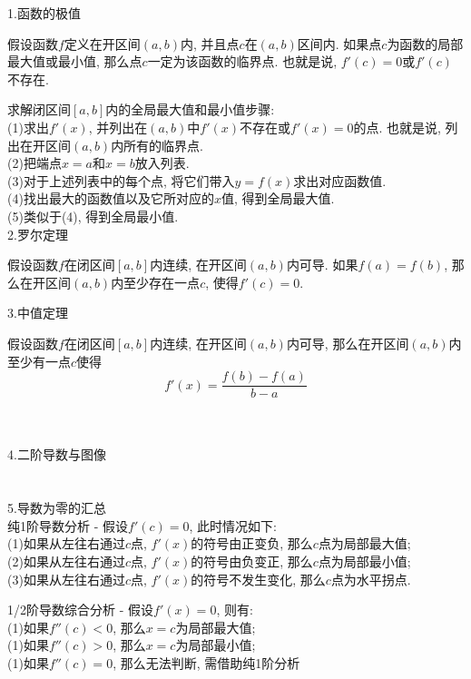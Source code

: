 \documentclass[UTF8, fontset=ubuntu]{ctexart}
\theoremstyle{empty}
\begin{document}
1.函数的极值
\begin{theorem}[极值定理]
假设函数$f$定义在开区间$(a,b)$内, 并且点$c$在$(a,b)$区间内. 如果点$c$为函数的局部最大值或最小值, 那么点$c$一定为该函数的临界点. 也就是说, $f'(c)=0$或$f'(c)$不存在.
\end{theorem}

求解闭区间$[a,b]$内的全局最大值和最小值步骤:\\
(1)求出$f'(x)$, 并列出在$(a,b)$中$f'(x)$不存在或$f'(x)=0$的点. 也就是说, 列出在开区间$(a,b)$内所有的临界点.\\
(2)把端点$x=a$和$x=b$放入列表.\\
(3)对于上述列表中的每个点, 将它们带入$y=f(x)$求出对应函数值.\\
(4)找出最大的函数值以及它所对应的$x$值, 得到全局最大值.\\
(5)类似于(4), 得到全局最小值.\\[2ex]

2.罗尔定理
\begin{theorem}[罗尔定理]
假设函数$f$在闭区间$[a,b]$内连续, 在开区间$(a,b)$内可导. 如果$f(a)=f(b)$, 那么在开区间$(a,b)$内至少存在一点$c$, 使得$f'(c)=0$.
\end{theorem}\vspace{4ex}

3.中值定理
\begin{theorem}[中值定理]
假设函数$f$在闭区间$[a,b]$内连续, 在开区间$(a,b)$内可导, 那么在开区间$(a,b)$内至少有一点$c$使得
\[f'(x)=\frac{f(b)-f(a)}{b-a}\]
\end{theorem}
\\[2ex]
\\[4ex]

4.二阶导数与图像\\[2ex]
\\[2ex]
\\[2ex]

5.导数为零的汇总\\
纯1阶导数分析 - 假设$f'(c)=0$, 此时情况如下:\\
(1)如果从左往右通过$c$点, $f'(x)$的符号由正变负, 那么$c$点为局部最大值;\\
(2)如果从左往右通过$c$点, $f'(x)$的符号由负变正, 那么$c$点为局部最小值;\\
(3)如果从左往右通过$c$点, $f'(x)$的符号不发生变化, 那么$c$点为水平拐点.

1/2阶导数综合分析 - 假设$f'(x)=0$, 则有:\\
(1)如果$f''(c)<0$, 那么$x=c$为局部最大值;\\
(1)如果$f''(c)>0$, 那么$x=c$为局部最小值;\\
(1)如果$f''(c)=0$, 那么无法判断, 需借助纯1阶分析\\
\end{document}
